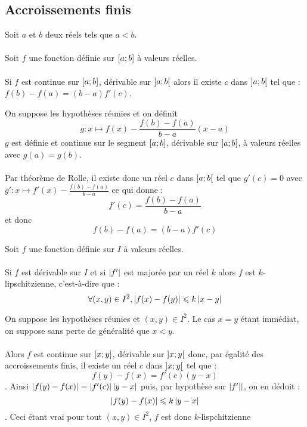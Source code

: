\subsection{Accroissements finis}
\begin{defprop}
    Soit \(a\) et \(b\) deux réels tels que \(a < b\).\\~\\
    Soit \(f\) une fonction définie sur \(\left[a;b\right]\) à valeurs réelles.\\~\\
    Si \(f\) est continue sur \(\left[a;b\right]\), dérivable sur \(\left]a;b\right[\) alors il existe \(c\) dans \(\left]a;b\right[\) tel que :\( f (b)-f (a) = (b-a)f '(c)\).
\end{defprop}
\begin{dem}
    On suppose les hypothèses réunies et on définit
    \[g : x \mapsto f (x) -\frac{ f (b) - f (a)}{b - a }(x - a)\]
    \(g\) est définie et continue sur le segment \(\left[a;b\right]\), dérivable sur \(\left]a;b\right[\), à valeurs réelles avec \(g(a) = g(b)\).\\~\\
    Par théorème de Rolle, il existe donc un réel \(c\) dans \(\left]a;b\right[\) tel que \(g'(c) = 0\) avec \(g' : x \mapsto f '(x)- \frac{f (b) - f (a)}{b - a}\)
    ce qui donne :
    \[f '(c) =\frac{ f (b) - f (a)}{b - a}\]
    et donc
    \[f (b) - f (a) = (b - a)f '(c)\]
\end{dem}

\begin{defprop}
    Soit \(f\) une fonction définie sur \(I\) à valeurs réelles.\\~\\
    Si \(f\) est dérivable sur \(I\) et si \(\left\lvert f '\right\rvert\) est majorée par un réel \(k\) alors \(f\) est \(k\)-lipschitzienne, c’est-à-dire que :
    \[\forall (x, y) \in I^2, \left\lvert f (x) - f (y)\right\rvert \leqslant k \left\lvert x - y\right\rvert \]
\end{defprop}

\begin{dem}
    On suppose les hypothèses réunies et \((x, y) \in I^2\). Le cas \(x = y\) étant immédiat, on suppose sans perte de généralité que \(x < y\).\\~\\
    Alors \(f\) est continue sur \(\left[x;y\right]\), dérivable sur \(\left]x;y\right[\) donc, par égalité des accroissements finis, il existe un réel \(c\) dans \(\left]x;y\right[\) tel que :
    \[f (y) - f (x) = f '(c) (y - x)\] .
    Ainsi \(\left\lvert f (y) - f (x)\right\rvert = \left\lvert f '(c)\right\rvert \left\lvert y - x\right\rvert\) puis, par hypothèse sur \(\left\lvert f '|\right\rvert\), on en déduit :
    \[\left\lvert f (y) - f (x)\right\rvert \leqslant k \left\lvert y - x\right\rvert \].
    Ceci étant vrai pour tout \((x, y) \in I^2\), \(f\) est donc \(k\)-lispchitzienne
\end{dem}


